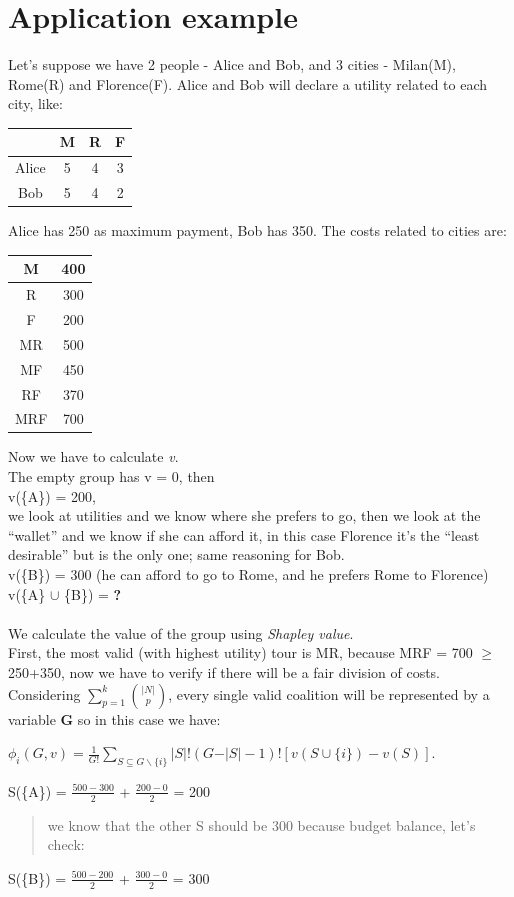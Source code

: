 \documentclass{article}
\begin{document}
\section{Application example}
\Large{
Let's suppose we have 2 people - Alice and Bob, and 3 cities - Milan(M), Rome(R) and Florence(F). Alice and Bob will declare a utility related to each city, like:
\begin{center}
\begin{tabular}{ |c|c|c|c| } 
 \hline
  & M & R & F \\ 
 \hline
 Alice & 5 & 4 & 3\\ 
 \hline
 Bob & 5 & 4 & 2\\ 
 \hline
\end{tabular}
\end{center}
Alice has 250 as maximum payment, Bob has 350. The costs related to cities are:
\begin{center}
\begin{tabular}{ |c|c| } 
 \hline
 M & 400 \\ 
 \hline
 R & 300\\ 
 \hline
 F & 200\\ 
 \hline
 MR & 500\\ 
 \hline
 MF & 450\\ 
 \hline
 RF & 370\\ 
 \hline
 MRF & 700\\ 
 \hline
\end{tabular}
\end{center}
Now we have to calculate \textit{v}. \\The empty group has v = 0, then \\v(\{A\}) = 200, \\we look at utilities and we know where she prefers to go, then we look at the “wallet” and we know if she can afford it, in this case Florence it's the “least desirable” but is the only one; same reasoning for Bob.\\
v(\{B\}) = 300 (he can afford to go to Rome, and he prefers Rome to Florence)\\
v(\{A\} $\cup$ \{B\}) = \textbf{?} \\\\
We calculate the value of the group using \textit{Shapley value}.\\
First, the most valid (with highest utility) tour is MR, because MRF = 700 $\ge$ 250+350, now we have to verify if there will be a fair division of costs.\\
Considering $\displaystyle\sum_{p=1}^k \binom {\vert N \vert} {p}$, every single valid coalition will be represented by a variable \textbf{G} so in this case we have:
\begin{center}
   \normalsize{
        $\phi_i(G,v) = \frac{1}{G!} \displaystyle \sum_{S \subseteq G \backslash \{i\}} \vert S \vert!(G -  \vert S \vert - 1)! [v(S \cup \{i\}) - v(S)]$.
    }
\end{center}
S(\{A\}) = $\frac {500 - 300} {2}$ + $\frac {200 - 0} {2}$  = 200
\begin{quote}
    we know that the other S should be 300 because budget balance, let's check:
\end{quote}
S(\{B\}) = $\frac {500 - 200} {2}$ + $\frac {300 - 0} {2}$ = 300
}
\end{document}
